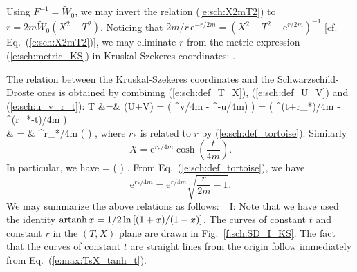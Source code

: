 Using $F^{-1} = \tilde{W}_0$, we may invert the relation (\ref{e:sch:X2mT2})
to $r = 2m \tilde{W}_0(X^2-T^2)$. Noticing that
$2m/r \, \mathrm{e}^{-r/2m} = (X^2-T^2 + \mathrm{e}^{r/2m})^{-1}$
[cf. Eq.~(\ref{e:sch:X2mT2})], we may eliminate $r$ from the metric expression
(\ref{e:sch:metric_KS}) in Kruskal-Szekeres coordinates:
\be \label{e:sch:metric_KS_TX_partial}
    .
\ee

The relation between the Kruskal-Szekeres coordinates and the
Schwarzschild-Droste ones is obtained by combining (\ref{e:sch:def_T_X}),
(\ref{e:sch:def_U_V}) and (\ref{e:sch:u_v_r_t}):
\bea
    T &=& (U+V) =  \left( ^{v/4m}
        - ^{-u/4m)} \right) =
         \left( ^{(t+r_*)/4m}
        - ^{(r_*-t)/4m} \right) \nonumber \\
     & = & ^{r_*/4m} \sinh\left(  \right) ,\nonumber
\eea
where $r_*$ is related to $r$ by (\ref{e:sch:def_tortoise}).
Similarly
\[
     X = \mathrm{e}^{r_*/4m} \cosh\left( \frac{t}{4m} \right) .
\]
In particular, we have
\be \label{e:max:TsX_tanh_t}
     = \tanh\left(  \right) .
\ee
From Eq.~(\ref{e:sch:def_tortoise}), we have
\[
    \mathrm{e}^{r_*/4m} = \mathrm{e}^{r/4m} \sqrt{ \frac{r}{2m} - 1 } .
\]
We may summarize the above relations as follows:
\be \label{e:sch:KS_SD_I}
    \M_{\rm I}: \quad {}
    \iff
\ee
Note that we have used the identity $\operatorname{artanh} x = 1/2 \ln\left[(1+x)/(1-x)\right]$.
The curves of constant $t$ and constant $r$ in the $(T,X)$ plane
are drawn in Fig.~\ref{f:sch:SD_I_KS}.
The fact that the curves of constant $t$ are straight lines from the
origin follow immediately
from Eq.~(\ref{e:max:TsX_tanh_t}).

